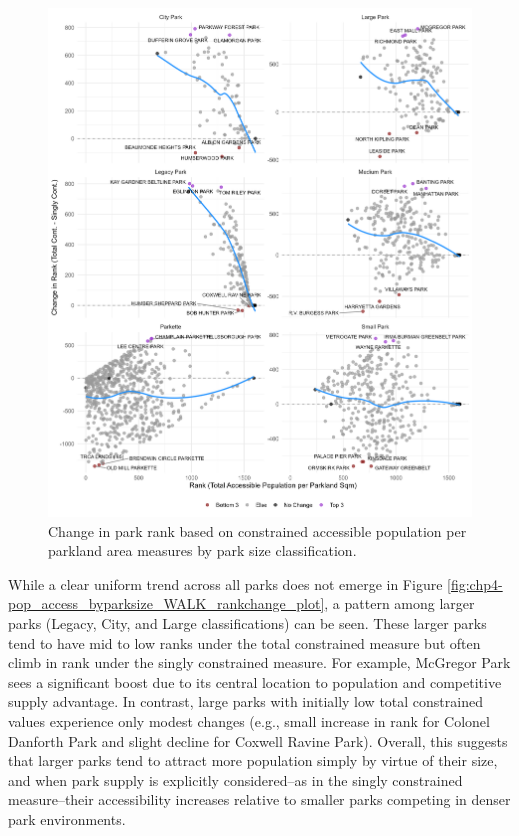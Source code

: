 \documentclass[
11pt, %
oneside, %
english, %
singlespacing, %
]{macthesis} %
\begin{document}
\begin{figure}

{\centering \includegraphics[width=6in]{./data/figures/chp4-pop_access_byparksize_WALK_rankchange_plot} 

}

\caption{\label{fig:chp4-pop_access_byparksize_WALK_rankchange_plot}Change in park rank based on constrained accessible population per parkland area measures by park size classification.}\label{fig:unnamed-chunk-70}
\end{figure}

While a clear uniform trend across all parks does not emerge in Figure \ref{fig:chp4-pop_access_byparksize_WALK_rankchange_plot}, a pattern among larger parks (Legacy, City, and Large classifications) can be seen. These larger parks tend to have mid to low ranks under the total constrained measure but often climb in rank under the singly constrained measure. For example, McGregor Park sees a significant boost due to its central location to population and competitive supply advantage. In contrast, large parks with initially low total constrained values experience only modest changes (e.g., small increase in rank for Colonel Danforth Park and slight decline for Coxwell Ravine Park). Overall, this suggests that larger parks tend to attract more population simply by virtue of their size, and when park supply is explicitly considered--as in the singly constrained measure--their accessibility increases relative to smaller parks competing in denser park environments.
\end{document}
